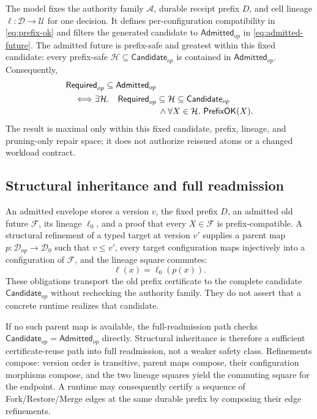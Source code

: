The model fixes the authority family $\mathcal A$, durable receipt prefix $D$,
and cell lineage $\ell:\mathcal D\to\mathcal U$ for one decision.
It defines per-configuration compatibility in
\cref{eq:prefix-ok} and filters the generated candidate to
$\mathsf{Admitted}_{op}$ in \cref{eq:admitted-future}.
The admitted future is prefix-safe and greatest within this fixed
candidate: every prefix-safe
$\mathcal H\subseteq\mathsf{Candidate}_{op}$ is contained in
$\mathsf{Admitted}_{op}$.  Consequently,
\begin{equation}
\begin{aligned}
  &\mathsf{Required}_{op}\subseteq\mathsf{Admitted}_{op}\\
  &\quad\Longleftrightarrow
    \exists\mathcal H.\quad
      \mathsf{Required}_{op}\subseteq\mathcal H
      \subseteq\mathsf{Candidate}_{op}\\[-2pt]
  &\hspace{38mm}{}\land
      \forall X\in\mathcal H.\ \mathsf{PrefixOK}(X).
\end{aligned}
\label{eq:required-preservable}
\end{equation}
The result is maximal only within this fixed candidate, prefix, lineage, and
pruning-only repair space; it does not authorize reissued atoms or a changed
workload contract.

\subsection{Structural inheritance and full readmission}

An admitted envelope stores a version $v$, the fixed prefix $D$, an admitted
old future $\mathcal F$, its lineage $\ell_0$, and a proof that every
$X\in\mathcal F$ is prefix-compatible.
A structural refinement of a typed target at version $v'$ supplies a parent
map $p:\mathcal D_{op}\to\mathcal D_0$ such that $v\leq v'$, every target
configuration maps injectively into a configuration of $\mathcal F$, and the
lineage square commutes:
\[
  \ell(x)=\ell_0(p(x)).
\]
These obligations transport the old prefix certificate to the complete
candidate $\mathsf{Candidate}_{op}$ without rechecking the authority family.
They do not assert that a concrete runtime realizes that candidate.

If no such parent map is available, the full-readmission path checks
$\mathsf{Candidate}_{op}=\mathsf{Admitted}_{op}$ directly.  Structural
inheritance is therefore a sufficient certificate-reuse path into full
readmission, not a weaker safety class.  Refinements compose: version order is
transitive, parent maps compose, their configuration morphisms compose, and
the two lineage squares yield the commuting square for the endpoint.  A
runtime may consequently certify a sequence of Fork/Restore/Merge edges at the
same durable prefix by composing their edge refinements.

